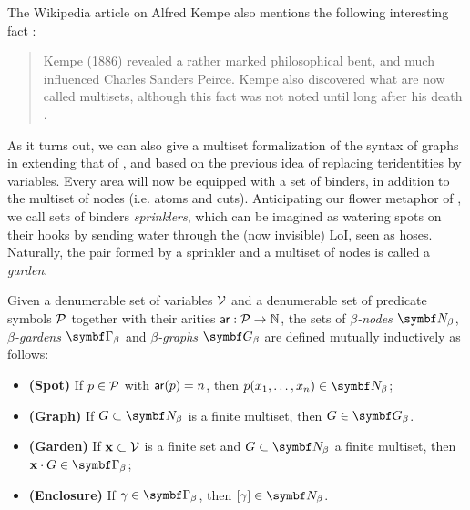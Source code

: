 The Wikipedia article on Alfred Kempe also mentions the following interesting
fact \cite{noauthor_alfred_2023}:
\begin{quote}
  Kempe (1886) revealed a rather marked philosophical bent, and much influenced
Charles Sanders Peirce. Kempe also discovered what are now called multisets,
although this fact was not noted until long after his death
.
\end{quote}
As it turns out, we can also give a multiset formalization of the syntax of
graphs in  extending that of , and based on the
previous idea of replacing teridentities by variables. Every area will now be
equipped with a set of binders, in addition to the multiset of nodes (i.e. atoms
and cuts). Anticipating our flower metaphor of , we call sets of
binders \emph{sprinklers}, which can be imagined as watering spots on their
hooks by sending water through the (now invisible) LoI, seen as hoses.
Naturally, the pair formed by a sprinkler and a multiset of nodes is called a
\emph{garden}.

\begin{definition} 
  
  Given a denumerable set of variables $\mathcal{V}$ and a denumerable set of
  predicate symbols $\mathcal{P}$ together with their arities $\mathsf{ar} : \mathcal{P} \to
  \mathbb{N}$, the sets of \emph{$\beta$-nodes} $\bnodes$, \emph{$\beta$-gardens}
  $\bgardens$ and \emph{$\beta$-graphs} $\bgraphs$ are defined mutually
  inductively as follows:
  \begin{itemize}
    \item \textbf{(Spot)} If $p \in \mathcal{P}$ with $\mathsf{ar}(p) = n$, then $p(x_1,
    \ldots, x_n) \in \bnodes$;
    \item \textbf{(Graph)} If $G \subset \bnodes$ is a finite multiset, then $G
    \in \bgraphs$.
    \item \textbf{(Garden)} If $\mathbf{x} \subset \mathcal{V}$ is a finite set and $G
    \subset \bnodes$ a finite multiset, then $\garden{\bx}{G} \in
    \bgardens$;
    \item \textbf{(Enclosure)} If $\gamma \in \bgardens$, then $[\gamma] \in \bnodes$.
  \end{itemize}
\end{definition}

